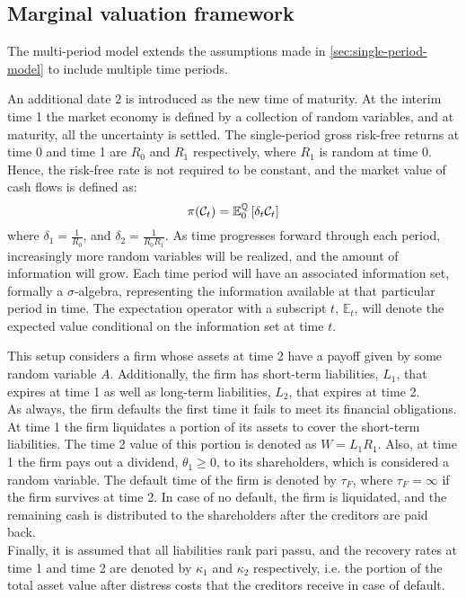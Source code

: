 \documentclass[main.tex]{subfiles}
\begin{document}
    \subsection{Marginal valuation framework}
        The multi-period model extends the assumptions made in \cref{sec:single-period-model} to include multiple time periods.

        An additional date $2$ is introduced as the new time of maturity.
        At the interim time 1 the market economy is defined by a collection of random variables,
        and at maturity, all the uncertainty is settled. 
        The single-period gross risk-free returns at time 0 and time 1 are $R_0$ and $R_1$ respectively, where $R_1$ is random at time 0.
        Hence, the risk-free rate is not required to be constant,
        and the market value of cash flows is defined as:
        \begin{equation}
            \pi(\mathcal{C}_{t}) =
            \mathbb{E}_{0}^{\mathbb{Q}}\left[\delta_t\mathcal{C}_{t}\right]
        \end{equation}
        where $\delta_1 = \frac{1}{R_0}$,
        and $\delta_2 = \frac{1}{R_{0}R_{1}}$.
        As time progresses forward through each period, 
        increasingly more random variables will be realized,
        and the amount of information will grow.
        Each time period will have an associated information set, formally a $\sigma$-algebra,
        representing the information available at that particular period in time.
        The expectation operator with a subscript $t$, $\mathbb{E}_{t}$, 
        will denote the expected value conditional on the information set at time $t$.

        This setup considers a firm whose assets at time 2 have a payoff given by some random variable $A$.
        Additionally, the firm has short-term liabilities, $L_1$, that expires at time 1 as well as long-term liabilities, $L_2$, that expires at time 2.
        \\
        As always, the firm defaults the first time it fails to meet its financial obligations.
        At time 1 the firm liquidates a portion of its assets to cover the short-term liabilities.
        The time 2 value of this portion is denoted as $W = L_1 R_1$.
        Also, at time 1 the firm pays out a dividend, $\theta_1 \geq 0$, to its shareholders,
        which is considered a random variable.
        The default time of the firm is denoted by $\tau_{F}$,
        where $\tau_{F} = \infty$ if the firm survives at time 2.
        In case of no default, the firm is liquidated, and the remaining cash is distributed to the shareholders after the creditors are paid back.
        \\
        Finally, it is assumed that all liabilities rank pari passu,
        and the recovery rates at time 1 and time 2 are denoted by $\kappa_1$ and $\kappa_2$ respectively,
        i.e. the portion of the total asset value after distress costs that the creditors receive in case of default.
\end{document}
